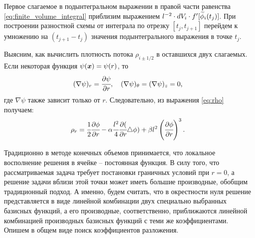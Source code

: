 Первое слагаемое в подынтегральном выражении в правой части равенства \eqref{eq:finite_volume_integral} приблизим выражением $l^{-2} \cdot dV_i \cdot f'[{\widetilde{\phi}}_i(t_j)]$. При построении разностной схемы от интеграла по отрезку $[t_j, t_{j + 1}]$ перейдем к умножению на $(t_{j + 1} - t_j)$ значения подынтегрального выражения в точке $t_j$.

Выясним, как вычислить плотность потока $\rho_{i \pm 1/2}$ в оставшихся двух слагаемых. Если некоторая функция $\psi({\boldsymbol{x}}) = \psi(r)$, то
$$(\nabla \psi)_r = \cfrac{\partial \psi}{\partial r}, \quad (\nabla \psi)_\theta = (\nabla \psi)_z = 0 {\text{,}}$$
где $\nabla \psi$ также зависит только от $r$. Следовательно, из выражения \eqref{eq:rho} получаем:
\begin{equation}
	\rho_r = \cfrac{1}{2} \cfrac{\partial \phi}{\partial r} - \alpha \cfrac{l^2}{4} \cfrac{\partial (}{\partial r}\triangle \phi) + \beta l^2 \left( \cfrac{\partial \phi}{\partial r} \right)^3 {\text{.}}
	\label{eq:finite_volumes_density}
\end{equation}

Традиционно в методе конечных объемов принимается, что локальное восполнение решения в ячейке -- постоянная функция. В силу того, что рассматриваемая задача требует постановки граничных условий при $r = 0$, а решение задачи вблизи этой точки может иметь большие производные, обобщим традиционный подход. А именно, будем считать, что в окрестности нуля решение представляется в виде линейной комбинации двух специально выбранных базисных функций, а его производные, соответственно, приближаются линейной комбинацией производных базисных функций с теми же коэффициентами. Опишем в общем виде поиск коэффициентов разложения.

